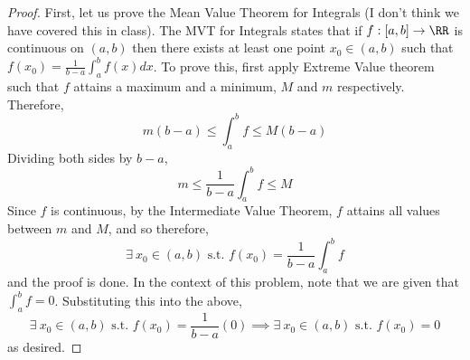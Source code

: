 \documentclass[12pt]{scrartcl}
\begin{document}
\begin{proof}
  
\hfill

First, let us prove the Mean Value Theorem for Integrals (I don't think we have covered this in class). The 
MVT for Integrals states that if $f: [a,b] \to \RR$ is continuous on $(a,b)$ then there exists at least one point 
$x_0 \in (a,b)$ such that $f(x_0) = \frac{1}{b-a}\int_a^b f(x) dx$. To prove this, first apply Extreme Value theorem
such that $f$ attains a maximum and a minimum, $M$ and $m$ respectively. Therefore, 
\[m(b-a) \leq \int_a^b f \leq M(b-a)\]
Dividing both sides by $b-a$,
\[m \leq \frac{1}{b-a}\int_a^b f \leq M\]
Since $f$ is continuous, by the Intermediate Value Theorem, $f$ attains all values between $m$ and $M$, and so therefore, 
\[\exists \ x_0 \in (a,b) \text{ s.t. } f(x_0) = \frac{1}{b-a}\int_a^b f\]
and the proof is done. In the context of this problem, note that we are given that $\int_a^b f = 0$. Substituting this into the above,
\[\exists \ x_0 \in (a,b) \text{ s.t. } f(x_0) = \frac{1}{b-a}(0) \implies \exists \ x_0 \in (a,b) \text{ s.t. } f(x_0) = 0\]
as desired.


\end{proof}
\newpage
\end{document}
